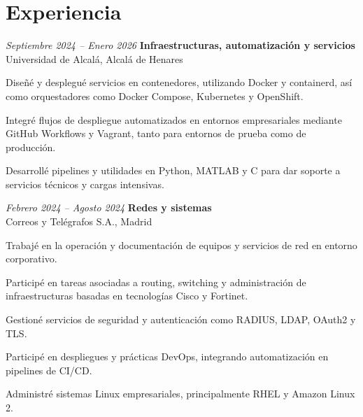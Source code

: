 \vspace{-7pt}

\section{Experiencia}

\begin{twocolentry}{\textit{Septiembre 2024 – Enero 2026}}
	\textbf{Infraestructuras, automatización y servicios} \\
	Universidad de Alcalá, Alcalá de Henares
\end{twocolentry}
\begin{onecolentry}
	\begin{highlights}
		\item Diseñé y desplegué servicios en contenedores, utilizando Docker y containerd, así como orquestadores como Docker Compose, Kubernetes y OpenShift.
		\item Integré flujos de despliegue automatizados en entornos empresariales mediante GitHub Workflows y Vagrant, tanto para entornos de prueba como de producción.
		\item Desarrollé pipelines y utilidades en Python, MATLAB y C para dar soporte a servicios técnicos y cargas intensivas.
	\end{highlights}
\end{onecolentry}

\vspace{0.2 cm}

\begin{twocolentry}{\textit{Febrero 2024 – Agosto 2024}}
	\textbf{Redes y sistemas} \\
	Correos y Telégrafos S.A., Madrid
\end{twocolentry}
\begin{onecolentry}
	\begin{highlights}
		\item Trabajé en la operación y documentación de equipos y servicios de red en entorno corporativo.
		\item Participé en tareas asociadas a routing, switching y administración de infraestructuras basadas en tecnologías Cisco y Fortinet.
		\item Gestioné servicios de seguridad y autenticación como RADIUS, LDAP, OAuth2 y TLS.
		\item Participé en despliegues y prácticas DevOps, integrando automatización en pipelines de CI/CD.
		\item Administré sistemas Linux empresariales, principalmente RHEL y Amazon Linux 2.
	\end{highlights}
\end{onecolentry}


